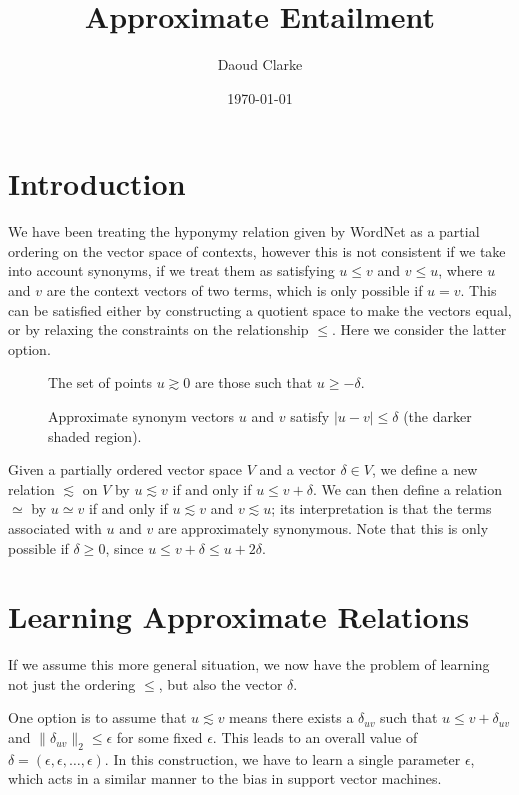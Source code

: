 \documentclass{article}
\title{Approximate Entailment}
\author{Daoud Clarke}
\date{\today}
\begin{document}
\maketitle

\section{Introduction}

We have been treating the hyponymy relation given by WordNet as a
partial ordering on the vector space of contexts, however this is not
consistent if we take into account synonyms, if we treat them as
satisfying $u \le v$ and $v\le u$, where $u$ and $v$ are the context
vectors of two terms, which is only possible if $u = v$. This can be
satisfied either by constructing a quotient space to make the vectors
equal, or by relaxing the constraints on the relationship $\le$. Here
we consider the latter option.

\begin{figure}
\def\svgwidth{5cm}
\centering

\caption{The set of points $u\gtrsim 0$ are those such that $u\ge-\delta$.}
\end{figure}


\begin{figure}
\def\svgwidth{5cm}
\centering

\caption{Approximate synonym vectors $u$ and $v$ satisfy $|u - v| \le \delta$ (the
  darker shaded region).}
\end{figure}

Given a partially ordered vector space $V$ and a vector $\delta \in
V$, we define a new relation $\lesssim$ on $V$ by $u \lesssim v$ if
and only if $u \le v + \delta$. We can then define a relation $\simeq$
by $u \simeq v$ if and only if $u\lesssim v$ and $v \lesssim u$; its
interpretation is that the terms associated with $u$ and $v$ are
approximately synonymous. Note that this is only possible if $\delta
\ge 0$, since $u \le v + \delta \le u + 2\delta$.

\section{Learning Approximate Relations}

If we assume this more general situation, we now have the problem of
learning not just the ordering $\le$, but also the vector
$\delta$.

One option is to assume that $u \lesssim v$ means there exists a
$\delta_{uv}$ such that $u \le v + \delta_{uv}$ and
$\|\delta_{uv}\|_2\le \epsilon$ for some fixed $\epsilon$. This leads
to an overall value of $\delta =
(\epsilon,\epsilon,\ldots,\epsilon)$. In this construction, we have to
learn a single parameter $\epsilon$, which acts in a similar manner to
the bias in support vector machines.
\end{document}
